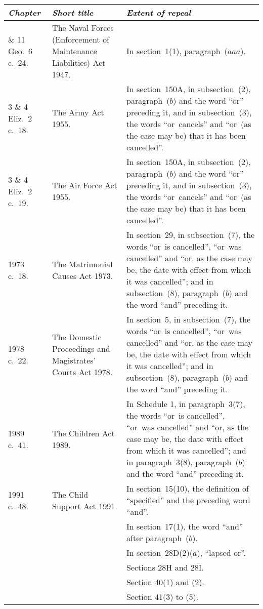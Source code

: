 \documentclass[12pt,a4paper]{article}
\begin{document}
{\footnotesize{}
\begin{longtable}{p{50pt}p{83.27403pt}p{220.72266pt}}
\hline
\itshape Chapter	&\itshape Short title	&\itshape Extent of repeal\\
\hline
\endhead
\hline
\endlastfoot
10 \& 11 Geo.\ 6 c.\ 24. 	&The Naval Forces (Enforcement of Maintenance Liabilities) Act 1947. 	&In section~1(1), paragraph~($aaa$).\\
3 \& 4 Eliz.\ 2 c.\ 18. 	&The Army Act 1955. 	&In section~150A, in subsection~(2), paragraph~($b$)  and the word “or” preceding it, and in subsection~(3), the words “or~cancels” and “or~(as the case may be) that it has been cancelled”.\\
3 \& 4 Eliz.\ 2 c.\ 19. 	&The Air Force Act 1955. 	&In section~150A, in subsection~(2), paragraph~($b$)  and the word “or” preceding it, and in subsection~(3), the words “or~cancels” and “or~(as the case may be) that it has been cancelled”.\\
1973 c.\ 18. 	&The Matrimonial Causes Act 1973. 	&In section~29, in subsection~(7), the words “or~is cancelled”, “or~was cancelled” and “or, as the case may be, the date with effect from which it was cancelled”; and in subsection~(8), paragraph~($b$)  and the word “and” preceding it.\\
1978 c.\ 22. 	&The Domestic Proceedings and Magistrates' Courts Act 1978. 	&In section~5, in subsection~(7), the words “or~is cancelled”, “or~was cancelled” and “or, as the case may be, the date with effect from which it was cancelled”; and in subsection~(8), paragraph~($b$)  and the word “and” preceding it.\\
1989 c.\ 41. 	&The Children Act 1989. 	&In Schedule 1, in paragraph~3(7), the words “or~is cancelled”, “or~was cancelled” and “or, as the case may be, the date with effect from which it was cancelled”; and in paragraph~3(8), paragraph~($b$)  and the word “and” preceding it.\\
1991 c.\ 48. 	&The Child Support Act 1991. 	&In section~15(10), the definition of “specified” and the preceding word “and”.\\
		&&In section~17(1), the word “and” after paragraph~($b$).\\
		&&In section~28D(2)($a$), “lapsed or”.\\
		&&Sections 28H and 28I.\\
		&&Section 40(1)  and (2).\\
		&&Section 41(3)  to (5).\\

\end{longtable}}
\end{document}
